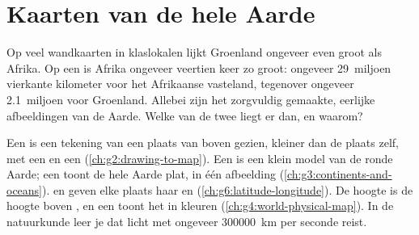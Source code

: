 \chapter{Kaarten van de hele Aarde}\label{ch:g9:maps-of-the-earth}

Op veel wandkaarten in klaslokalen lijkt Groenland ongeveer even groot als
Afrika. Op een  is Afrika ongeveer veertien keer zo groot: ongeveer
29~miljoen vierkante kilometer voor het Afrikaanse vasteland, tegenover
ongeveer 2.1~miljoen voor Groenland. Allebei zijn het zorgvuldig gemaakte,
eerlijke afbeeldingen van de Aarde. Welke van de twee liegt er dan, en
waarom?

\begin{recall}
Een  is een tekening van een plaats van boven gezien, kleiner dan de
plaats zelf, met een  en een  (\cref{ch:g2:drawing-to-map}).
Een  is een klein model van de ronde Aarde; een  toont de
hele Aarde plat, in één afbeelding (\cref{ch:g3:continents-and-oceans}).
 en  geven elke plaats haar  en
 (\cref{ch:g6:latitude-longitude}). De hoogte is de hoogte boven
, en een  toont het  in kleuren
(\cref{ch:g4:world-physical-map}). In de natuurkunde leer je dat licht met
ongeveer \qty{300000}{km} per seconde reist.
\end{recall}

